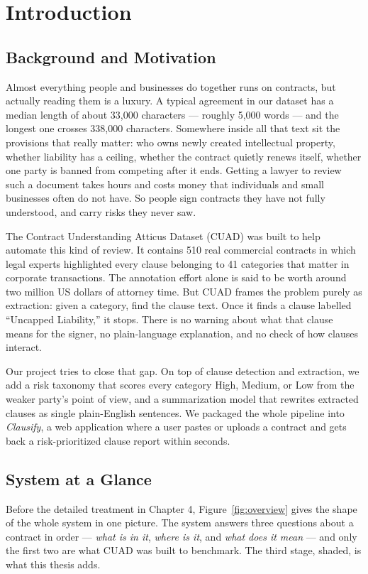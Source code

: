 \chapter{Introduction}

\section{Background and Motivation}
Almost everything people and businesses do together runs on contracts, but actually reading them is a luxury. A typical agreement in our dataset has a median length of about 33{,}000 characters --- roughly 5{,}000 words --- and the longest one crosses 338{,}000 characters. Somewhere inside all that text sit the provisions that really matter: who owns newly created intellectual property, whether liability has a ceiling, whether the contract quietly renews itself, whether one party is banned from competing after it ends. Getting a lawyer to review such a document takes hours and costs money that individuals and small businesses often do not have. So people sign contracts they have not fully understood, and carry risks they never saw.

The Contract Understanding Atticus Dataset (CUAD) \cite{hendrycks2021cuad} was built to help automate this kind of review. It contains 510 real commercial contracts in which legal experts highlighted every clause belonging to 41 categories that matter in corporate transactions. The annotation effort alone is said to be worth around two million US dollars of attorney time. But CUAD frames the problem purely as extraction: given a category, find the clause text. Once it finds a clause labelled ``Uncapped Liability,'' it stops. There is no warning about what that clause means for the signer, no plain-language explanation, and no check of how clauses interact.

Our project tries to close that gap. On top of clause detection and extraction, we add a risk taxonomy that scores every category High, Medium, or Low from the weaker party's point of view, and a summarization model that rewrites extracted clauses as single plain-English sentences. We packaged the whole pipeline into \emph{Clausify}, a web application where a user pastes or uploads a contract and gets back a risk-prioritized clause report within seconds.

\section{System at a Glance}
Before the detailed treatment in Chapter 4, Figure~\ref{fig:overview} gives the shape of the whole system in one picture. The system answers three questions about a contract in order --- \emph{what is in it}, \emph{where is it}, and \emph{what does it mean} --- and only the first two are what CUAD was built to benchmark. The third stage, shaded, is what this thesis adds.

